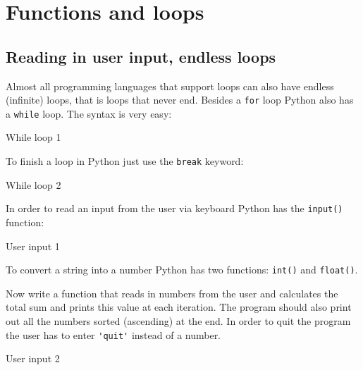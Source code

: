 \section{Functions and loops}

\subsection{Reading in user input, endless loops}
Almost all programming languages that support loops can also have endless (infinite) loops, that is loops that never end.
Besides a \verb|for| loop Python also has a \verb|while| loop. The syntax is very easy:


\begin{tcolorbox}[enhanced jigsaw,breakable,pad at break*=1mm,
    colback=blue!5!white,colframe=babyblueeyes,title=Solutions,
    watermark color=white]
    While loop 1
    
\end{tcolorbox}

To finish a loop in Python just use the \verb|break| keyword:

\begin{tcolorbox}[enhanced jigsaw,breakable,pad at break*=1mm,
    colback=blue!5!white,colframe=babyblueeyes,title=Solutions,
    watermark color=white]
    While loop 2
    
\end{tcolorbox}

In order to read an input from the user via keyboard Python has the \verb|input()| function:

\begin{tcolorbox}[enhanced jigsaw,breakable,pad at break*=1mm,
    colback=blue!5!white,colframe=babyblueeyes,title=Solutions,
    watermark color=white]
    User input 1
    
\end{tcolorbox}

To convert a string into a number Python has two functions: \verb|int()| and \verb|float()|.

Now write a function that reads in numbers from the user and calculates the total sum and prints this value at each iteration.
The program should also print out all the numbers sorted (ascending) at the end. In order to quit the program the user has to enter \verb|'quit'| instead of a number.

\ifanswers
\begin{tcolorbox}[enhanced jigsaw,breakable,pad at break*=1mm,
    colback=blue!5!white,colframe=babyblueeyes,title=Solutions,
    watermark color=white]
    User input 2
    
\end{tcolorbox}
\fi

